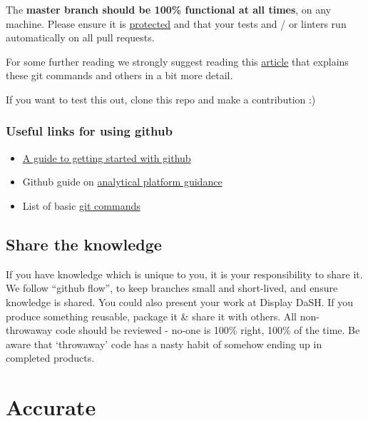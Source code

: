 \documentclass[]{book}
\providecommand{\tightlist}{%
  \setlength{\itemsep}{0pt}\setlength{\parskip}{0pt}}
\begin{document}
The \textbf{master branch should be 100\% functional at all times}, on any machine. Please ensure it is \href{https://help.github.com/articles/about-protected-branches/}{protected} and that your tests and / or linters run automatically on all pull requests.

For some further reading we strongly suggest reading this \href{https://gist.github.com/blackfalcon/8428401}{article} that explains these git commands and others in a bit more detail.

If you want to test this out, clone this repo and make a contribution :)

\hypertarget{gitlink}{%
\subsubsection*{Useful links for using github}\label{gitlink}}

\begin{itemize}
\tightlist
\item
  \href{https://jennybc.github.io/2014-05-12-ubc/ubc-r/session2.4_github.html}{A guide to getting started with github}\\
\item
  Github guide on \href{https://user-guidance.services.alpha.mojanalytics.xyz/github.html\#creating-your-project-repo-on-github}{analytical platform guidance}\\
\item
  List of basic \href{https://guides.github.com/introduction/git-handbook/}{git commands}
\end{itemize}

\hypertarget{knowledge}{%
\subsection{Share the knowledge}\label{knowledge}}

If you have knowledge which is unique to you, it is your responsibility to share it.
We follow ``github flow'', to keep branches small and short-lived, and ensure knowledge is shared.
You could also present your work at Display DaSH.
If you produce something reusable, package it \& share it with others.
All non-throwaway code should be reviewed - no-one is 100\% right, 100\% of the time.
Be aware that `throwaway' code has a nasty habit of somehow ending up in completed products.

\hypertarget{accurate}{%
\section{Accurate}\label{accurate}}
\end{document}
